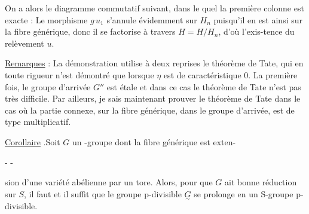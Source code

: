 On a alors le diagramme commutatif suivant, dans le quel la première colonne est exacte :
Le morphisme $g\,u_1$ s'annule évidemment sur $H_n$ puisqu'il en est ainsi sur la fibre générique, donc il se factorise à travers $H=H/H_n$, d'où l'exis-tence du relèvement $u$.

\uline{Remarques} : La démonstration utilise à deux reprises le théorème de Tate, qui en toute rigueur n'est démontré que lorsque $\eta$ est de caractéristique $0$. La première fois, le groupe d'arrivée $G''$ est étale et dans ce cas le théorème de Tate n'est pas très difficile. Par ailleurs, je sais maintenant prouver le théorème de Tate dans le cas où la partie connexe, sur la fibre générique, dans le groupe d'arrivée, est de type multiplicatif.

\uline{Corollaire} .Soit $G$ un \inserted{$\eta$}-groupe  dont la fibre générique est exten-


-  -

sion d'une variété abélienne par un tore. Alors, pour que $G$  ait bonne réduction sur $S$,  il faut et il suffit que le groupe p-divisible $\underset{\sim}{G}$ se prolonge en un S-groupe p-divisible.



